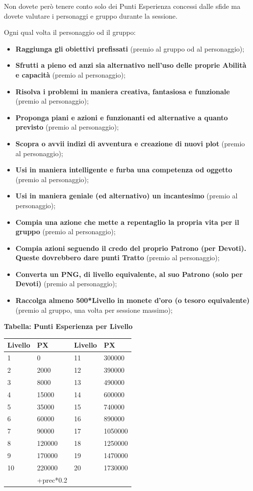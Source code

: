 \begin{multicols}{2}
\medskip

Non dovete però tenere conto solo dei Punti Esperienza concessi dalle sfide ma dovete valutare i personaggi e gruppo durante la sessione.

Ogni qual volta il personaggio od il gruppo:\label{puntiesperienzabonus}
\begin{itemize}[leftmargin=*] \setlength{\itemsep}{0pt}
\item \textbf{Raggiunga gli obiettivi prefissati} (premio al gruppo od al personaggio);
\item \textbf{Sfrutti a pieno ed anzi sia alternativo nell'uso delle proprie Abilità e capacità} (premio al personaggio);
\item \textbf{Risolva i problemi in maniera creativa, fantasiosa e funzionale} (premio al personaggio);
\item \textbf{Proponga piani e azioni e funzionanti ed alternative a quanto previsto} (premio al personaggio);
\item \textbf{Scopra o avvii indizi di avventura e creazione di nuovi plot} (premio al personaggio);
\item \textbf{Usi in maniera intelligente e furba una competenza od oggetto} (premio al personaggio);
\item \textbf{Usi in maniera geniale (ed alternativo) un incantesimo} (premio al personaggio);
\item \textbf{Compia una azione che mette a repentaglio la propria vita per il gruppo} (premio al personaggio);
\item \textbf{Compia azioni seguendo il credo del proprio Patrono (per Devoti). Queste dovrebbero dare punti Tratto} (premio al personaggio);
\item \textbf{Converta un PNG, di livello equivalente, al suo Patrono (solo per Devoti)} (premio al personaggio);
\item \textbf{Raccolga almeno 500*Livello in monete d'oro (o tesoro equivalente)} (premio al gruppo, una volta per sessione massimo);
\end{itemize}

\medskip

\textbf{Tabella: Punti Esperienza per Livello}\label{tabellapuntiesperienza}

\begin{tabularx}{0.45\textwidth}{lX|lX}
	\textbf{Livello} & \textbf{PX}&\textbf{Livello} & \textbf{PX}\\
	\toprule
	1&0&11&300000\\
	2&2000&12&390000\\
	3&8000&13&490000\\
	4&15000&14&600000\\
	5&35000&15&740000\\
	6&60000&16&890000\\
	7&90000&17&1050000\\
	8&120000&18&1250000\\
	9&170000&19&1470000\\
	10&220000&20&1730000\\
	&+prec*0.2&&
\end{tabularx}


\end{multicols}
